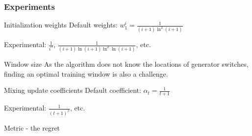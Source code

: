 \begin{frame}
\frametitle{Experiments}
\begin{block}{Initialization weights}
Default weights: $w_1^i = \frac{1}{(i+1)\ln^2(i+1)}$

Experimental: $\frac{1}{i^\alpha}$, $\frac{1}{(i+1)\ln(i+1)\ln^2\ln(i+1)}$, etc.
\end{block}

\begin{block}{Window size}
As the algorithm does not know the locations of generator switches, finding an optimal training window is also a challenge.
\end{block}

\begin{block}{Mixing update coefficients}
Default coefficient: $\alpha_t = \frac{1}{t+1}$

Experimental:  $\frac{1}{(t+1)^\beta}$, etc.

\end{block}

Metric - the regret
\end{frame}


%
%
%
%


